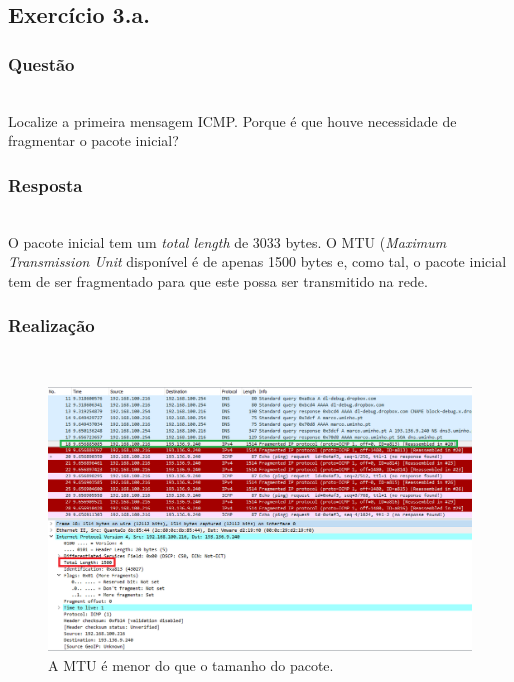 \documentclass{llncs}
\begin{document}

\subsection{Exercício 3.a.}
\subsubsection{Questão}\rule[-10pt]{0pt}{10pt}\\

Localize a primeira mensagem ICMP. Porque é que houve necessidade de fragmentar o pacote inicial?

\subsubsection{Resposta}\rule[-10pt]{0pt}{10pt}\\

O pacote inicial tem um \textit{total length} de 3033 bytes. O MTU (\textit{Maximum Transmission Unit} disponível é de apenas 1500 bytes e, como tal, o pacote inicial tem de ser fragmentado para que este possa ser transmitido na rede.

\subsubsection{Realização}\rule[-10pt]{0pt}{10pt}\\

\begin{figure}
	\begin{center}
	\includegraphics[scale=0.35]{./imagens/packet_frag.png} 
	\end{center}
	\caption{\label{fig:packet_frag}A MTU é menor do que o tamanho do pacote.}
\end{figure} 
\end{document}
